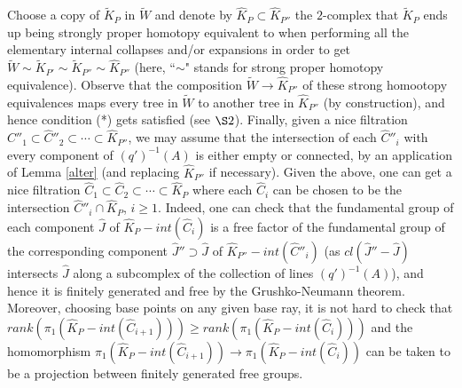\documentclass{amsart}[12pt]
\theoremstyle{definition}
\theoremstyle{remark}
\numberwithin{equation}{section}
\begin{document}
 Choose a copy of $\widetilde{K}_P$
in $\widetilde{W}$ and denote by $\widehat{K}_P {\subset}
\widehat{K}_{P''}$ the $2$-complex that $\widetilde{K}_P$ ends up
being strongly proper homotopy equivalent to when performing all
the elementary internal collapses and/or expansions in order to
get $\widetilde{W} \sim \widetilde{K}_{P'} \sim
\widetilde{K}_{P''} \sim \widehat{K}_{P''}$ (here, ``$\sim$"
stands for strong proper homotopy equivalence). Observe that the
composition $\widetilde{W} {\longrightarrow} \widehat{K}_{P''}$ of these strong
homootopy equivalences maps every tree in $\widetilde{W}$ to
another tree in $\widehat{K}_{P''}$ (by construction), and hence
condition (*) gets satisfied (see $\S 2$). Finally, given a nice
filtration $\widehat{C}''_1 {\subset} \widehat{C}''_2 {\subset} \cdots {\subset}
\widehat{K}_{P''}$, we may assume that the intersection of each
$\widehat{C}''_i$ with every component of $(q')^{-1}(A)$ is either
empty or connected, by an application of Lemma \ref{alter} (and
replacing $\widehat{K}_{P''}$ if necessary). Given the above, one
can get a nice filtration $\widehat{C}_1 {\subset} \widehat{C}_2 {\subset}
\cdots {\subset} \widehat{K}_P$ where each $\widehat{C}_i$ can be
chosen to be the intersection $\widehat{C}''_i \cap
\widehat{K}_P$, $i \geq 1$. Indeed, one can check that the
fundamental group of each component $\widehat{J}$ of
$\widehat{K}_P - int(\widehat{C}_i)$ is a free factor of the
fundamental group of the corresponding component $\widehat{J}''
\supset \widehat{J}$ of $\widehat{K}_{P''} - int(\widehat{C}''_i)$
(as $cl(\widehat{J}'' - \widehat{J})$ intersects $\widehat{J}$
along a subcomplex of the collection of lines $(q')^{-1}(A)$), and
hence it is finitely generated and free by the Grushko-Neumann
theorem. Moreover, choosing base points on any given base ray, it
is not hard to check that $rank(\pi_1(\widehat{K}_P -
int(\widehat{C}_{i+1}))) \geq rank(\pi_1(\widehat{K}_P -
int(\widehat{C}_i)))$ and the homomorphism $\pi_1(\widehat{K}_P
-int(\widehat{C}_{i+1})) {\longrightarrow} \pi_1(\widehat{K}_P -
int(\widehat{C}_i))$ can be taken to be a projection between
finitely generated free groups.
\end{document}
